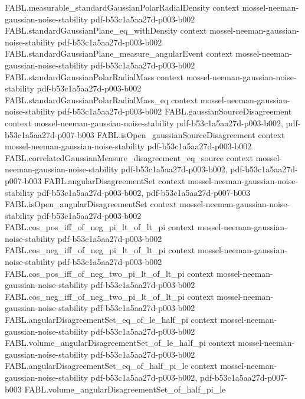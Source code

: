 \begin{theorem}
\proofstep
  {FABL.measurable_standardGaussianPolarRadialDensity}
  {context}
  {mossel-neeman-gaussian-noise-stability}
  {pdf-b53c1a5aa27d-p003-b002}
\proofstep
  {FABL.standardGaussianPlane_eq_withDensity}
  {context}
  {mossel-neeman-gaussian-noise-stability}
  {pdf-b53c1a5aa27d-p003-b002}
\proofstep
  {FABL.standardGaussianPlane_measure_angularEvent}
  {context}
  {mossel-neeman-gaussian-noise-stability}
  {pdf-b53c1a5aa27d-p003-b002}
\proofstep
  {FABL.standardGaussianPolarRadialMass}
  {context}
  {mossel-neeman-gaussian-noise-stability}
  {pdf-b53c1a5aa27d-p003-b002}
\proofstep
  {FABL.standardGaussianPolarRadialMass_eq}
  {context}
  {mossel-neeman-gaussian-noise-stability}
  {pdf-b53c1a5aa27d-p003-b002}
\proofstep
  {FABL.gaussianSourceDisagreement}
  {context}
  {mossel-neeman-gaussian-noise-stability}
  {pdf-b53c1a5aa27d-p003-b002,
    pdf-b53c1a5aa27d-p007-b003}
\proofstep
  {FABL.isOpen_gaussianSourceDisagreement}
  {context}
  {mossel-neeman-gaussian-noise-stability}
  {pdf-b53c1a5aa27d-p003-b002}
\proofstep
  {FABL.correlatedGaussianMeasure_disagreement_eq_source}
  {context}
  {mossel-neeman-gaussian-noise-stability}
  {pdf-b53c1a5aa27d-p003-b002,
    pdf-b53c1a5aa27d-p007-b003}
\proofstep
  {FABL.angularDisagreementSet}
  {context}
  {mossel-neeman-gaussian-noise-stability}
  {pdf-b53c1a5aa27d-p003-b002,
    pdf-b53c1a5aa27d-p007-b003}
\proofstep
  {FABL.isOpen_angularDisagreementSet}
  {context}
  {mossel-neeman-gaussian-noise-stability}
  {pdf-b53c1a5aa27d-p003-b002}
\proofstep
  {FABL.cos_pos_iff_of_neg_pi_lt_of_lt_pi}
  {context}
  {mossel-neeman-gaussian-noise-stability}
  {pdf-b53c1a5aa27d-p003-b002}
\proofstep
  {FABL.cos_neg_iff_of_neg_pi_lt_of_lt_pi}
  {context}
  {mossel-neeman-gaussian-noise-stability}
  {pdf-b53c1a5aa27d-p003-b002}
\proofstep
  {FABL.cos_pos_iff_of_neg_two_pi_lt_of_lt_pi}
  {context}
  {mossel-neeman-gaussian-noise-stability}
  {pdf-b53c1a5aa27d-p003-b002}
\proofstep
  {FABL.cos_neg_iff_of_neg_two_pi_lt_of_lt_pi}
  {context}
  {mossel-neeman-gaussian-noise-stability}
  {pdf-b53c1a5aa27d-p003-b002}
\proofstep
  {FABL.angularDisagreementSet_eq_of_le_half_pi}
  {context}
  {mossel-neeman-gaussian-noise-stability}
  {pdf-b53c1a5aa27d-p003-b002}
\proofstep
  {FABL.volume_angularDisagreementSet_of_le_half_pi}
  {context}
  {mossel-neeman-gaussian-noise-stability}
  {pdf-b53c1a5aa27d-p003-b002}
\proofstep
  {FABL.angularDisagreementSet_eq_of_half_pi_le}
  {context}
  {mossel-neeman-gaussian-noise-stability}
  {pdf-b53c1a5aa27d-p003-b002,
    pdf-b53c1a5aa27d-p007-b003}
\proofstep
  {FABL.volume_angularDisagreementSet_of_half_pi_le}

\end{theorem}
